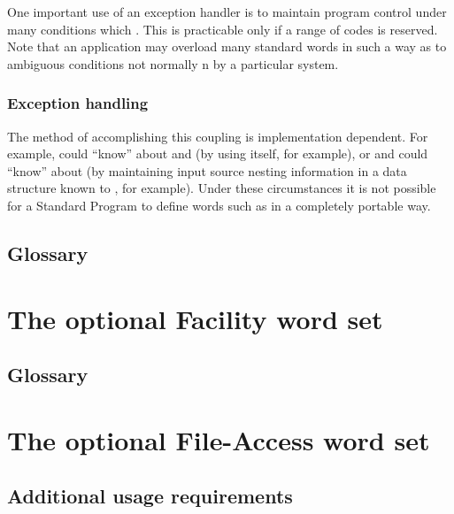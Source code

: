 One important use of an exception handler is to maintain program
control under many conditions which .  This is practicable
only if a range of codes is reserved.  Note that an application may
overload many standard words in such a way as to 
ambiguous conditions not normally n by a particular
system.

\setcounter{subsubsection}{5}
\subsubsection{Exception handling} %

The method of accomplishing this coupling is implementation dependent.
For example,  could ``know'' about  and
 (by using  itself, for example), or
 and  could ``know'' about 
(by maintaining input source nesting information in a data structure
known to , for example). Under these circumstances it is
not possible for a Standard Program to define words such as
 in a completely portable way.

\setcounter{subsection}{5}
\subsection{Glossary} %



\section{The optional Facility word set} %
\label{rat:facility}

\setcounter{subsection}{5}
\subsection{Glossary} %



\section{The optional File-Access word set} %
\label{rat:file}

\setcounter{subsection}{2}
\subsection{Additional usage requirements} %

